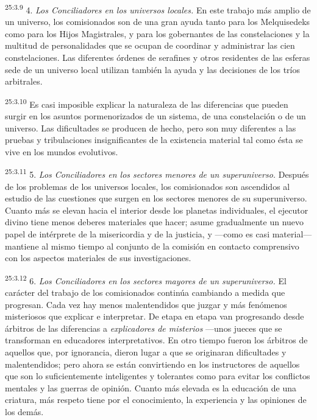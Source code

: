 \par
\textsuperscript{25:3.9} 4. \textit{Los Conciliadores en los universos locales.} En este trabajo más amplio de un universo, los comisionados son de una gran ayuda tanto para los Melquisedeks como para los Hijos Magistrales, y para los gobernantes de las constelaciones y la multitud de personalidades que se ocupan de coordinar y administrar las cien constelaciones. Las diferentes órdenes de serafines y otros residentes de las esferas sede de un universo local utilizan también la ayuda y las decisiones de los tríos arbitrales.

\par
\textsuperscript{25:3.10} Es casi imposible explicar la naturaleza de las diferencias que pueden surgir en los asuntos pormenorizados de un sistema, de una constelación o de un universo. Las dificultades se producen de hecho, pero son muy diferentes a las pruebas y tribulaciones insignificantes de la existencia material tal como ésta se vive en los mundos evolutivos.

\par
\textsuperscript{25:3.11} 5. \textit{Los Conciliadores en los sectores menores de un superuniverso.} Después de los problemas de los universos locales, los comisionados son ascendidos al estudio de las cuestiones que surgen en los sectores menores de su superuniverso. Cuanto más se elevan hacia el interior desde los planetas individuales, el ejecutor divino tiene menos deberes materiales que hacer; asume gradualmente un nuevo papel de intérprete de la misericordia y de la justicia, y ---como es casi material--- mantiene al mismo tiempo al conjunto de la comisión en contacto comprensivo con los aspectos materiales de sus investigaciones.

\par
\textsuperscript{25:3.12} 6. \textit{Los Conciliadores en los sectores mayores de un superuniverso.} El carácter del trabajo de los comisionados continúa cambiando a medida que progresan. Cada vez hay menos malentendidos que juzgar y más fenómenos misteriosos que explicar e interpretar. De etapa en etapa van progresando desde árbitros de las diferencias a \textit{explicadores de misterios} ---unos jueces que se transforman en educadores interpretativos. En otro tiempo fueron los árbitros de aquellos que, por ignorancia, dieron lugar a que se originaran dificultades y malentendidos; pero ahora se están convirtiendo en los instructores de aquellos que son lo suficientemente inteligentes y tolerantes como para evitar los conflictos mentales y las guerras de opinión. Cuanto más elevada es la educación de una criatura, más respeto tiene por el conocimiento, la experiencia y las opiniones de los demás.

